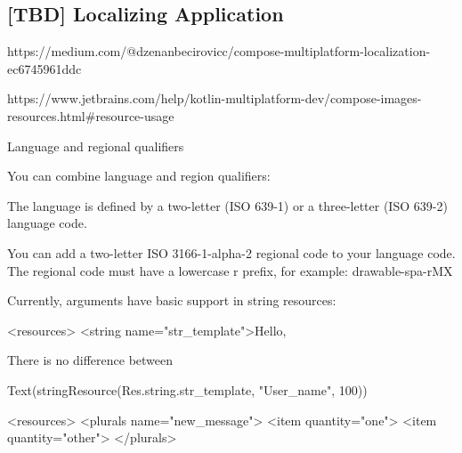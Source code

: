 
\subsection{[TBD] Localizing Application}

\cite{Beci24} 

https://medium.com/@dzenanbecirovicc/compose-multiplatform-localization-ec6745961ddc

https://www.jetbrains.com/help/kotlin-multiplatform-dev/compose-images-resources.html#resource-usage

Language and regional qualifiers

You can combine language and region qualifiers:

    The language is defined by a two-letter (ISO 639-1) or a three-letter (ISO 639-2) language code.

    You can add a two-letter ISO 3166-1-alpha-2 regional code to your language code. The regional code must have a lowercase r prefix, for example: drawable-spa-rMX


Currently, arguments have basic support in string resources:

<resources>
    <string name="str_template">Hello, %


There is no difference between %

Text(stringResource(Res.string.str_template, "User_name", 100))

<resources>
    <plurals name="new_message">
        <item quantity="one">%
        <item quantity="other">%
    </plurals>